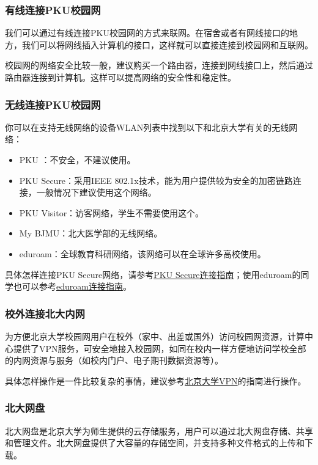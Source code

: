 \documentclass[../main.tex]{subfiles}
\begin{document}
\subsubsection{有线连接PKU校园网}

我们可以通过有线连接PKU校园网的方式来联网。在宿舍或者有网线接口的地方，我们可以将网线插入计算机的接口，这样就可以直接连接到校园网和互联网。

校园网的网络安全比较一般，建议购买一个路由器，连接到网线接口上，然后通过路由器连接到计算机。这样可以提高网络的安全性和稳定性。

\subsubsection{无线连接PKU校园网}

你可以在支持无线网络的设备WLAN列表中找到以下和北京大学有关的无线网络：
\begin{itemize}
  \item PKU ：不安全，不建议使用。
  \item PKU Secure：采用IEEE 802.1x技术，能为用户提供较为安全的加密链路连接，一般情况下建议使用这个网络。
  \item PKU Visitor：访客网络，学生不需要使用这个。
  \item My BJMU：北大医学部的无线网络。
  \item eduroam：全球教育科研网络，该网络可以在全球许多高校使用。
\end{itemize}
具体怎样连接PKU Secure网络，请参考\href{https://its.pku.edu.cn/setting_6.jsp}{PKU Secure连接指南}；使用eduroam的同学也可以参考\href{https://its.pku.edu.cn/service_1_eduroam.jsp}{eduroam连接指南}。

\subsubsection{校外连接北大内网}

为方便北京大学校园网用户在校外（家中、出差或国外）访问校园网资源，计算中心提供了VPN服务，可安全地接入校园网，如同在校内一样方便地访问学校全部的内网资源与服务（如校内门户、电子期刊数据资源等）。

具体怎样操作是一件比较复杂的事情，建议参考\href{https://its.pku.edu.cn/service_1_vpn.jsp}{北京大学VPN}的指南进行操作。

\subsubsection{北大网盘}

北大网盘是北京大学为师生提供的云存储服务，用户可以通过北大网盘存储、共享和管理文件。北大网盘提供了大容量的存储空间，并支持多种文件格式的上传和下载。
\end{document}
